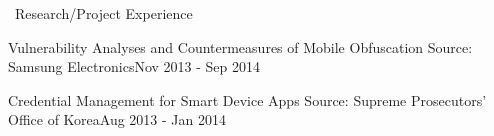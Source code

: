 \documentclass{resume} %
\begin{document}
\begin{rSection}{\faGenderless~Research/Project Experience}
\begin{rSubsection3}
		{Vulnerability Analyses and Countermeasures of Mobile Obfuscation}
		{Source: Samsung Electronics}{Nov 2013 - Sep 2014}
	\end{rSubsection3}
	\vspace{-3mm}
	\begin{rSubsection3}
		{Credential Management for Smart Device Apps}
		{Source: Supreme Prosecutors' Office of Korea}{Aug 2013 - Jan 2014}
	\end{rSubsection3}
\end{rSection}

\end{document}
